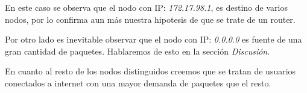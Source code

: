 En este caso se observa que el nodo con IP: \textit{172.17.98.1}, es destino de varios nodos, por lo confirma aun más nuestra hipotesis de que se trate de un router.

Por otro lado es inevitable observar que el nodo con IP: \textit{0.0.0.0} es fuente de una gran cantidad de paquetes. Hablaremos de esto en la sección \textit{Discusión}. 

En cuanto al resto de los nodos distinguidos creemos que se tratan de usuarios conectados a internet con una mayor demanda de paquetes que el resto.
